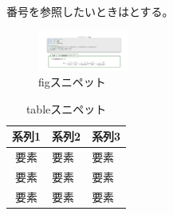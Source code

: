 \documentclass[uplatex,dvipdfmx,ja=standard,a4paper]{bxjsarticle}
\begin{document}
番号を参照したいときはとする。

\begin{figure}[h]
  \centering
  \includegraphics[keepaspectratio, width=3cm,clip]{hoge.png}
  \caption{figスニペット}
  \label{fig:hoge}
\end{figure}

\begin{table}[h]
  \centering
  \caption{tableスニペット}
  \label{table:}
  \begin{tabular}{cll}
    \hline
    系列1 & 系列2 & 系列3 \\
    \hline
    要素 & 要素 & 要素 \\[-4pt]
    要素 & 要素 & 要素 \\[-4pt]
    要素 & 要素 & 要素 \\
    \hline
  \end{tabular}
\end{table}
\end{document}
